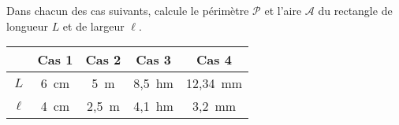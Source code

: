 Dans chacun des cas suivants, calcule le périmètre $\mathscr{P}$ et l'aire $\mathscr{A}$ du rectangle de longueur $L$ et de largeur $\ell$.
\begin{center}
  \begin{tabular}{|c|c|c|c|c|}
\cline{2-5}
\multicolumn{1}{c|}{}&Cas 1&Cas 2&Cas 3&Cas 4\\
\hline
$L$&6~cm&5~m&8,5~hm&12,34~mm\\
\hline
$\ell$&4~cm&2,5~m&4,1~hm&3,2~mm\\
\hline
  \end{tabular}
\end{center}
